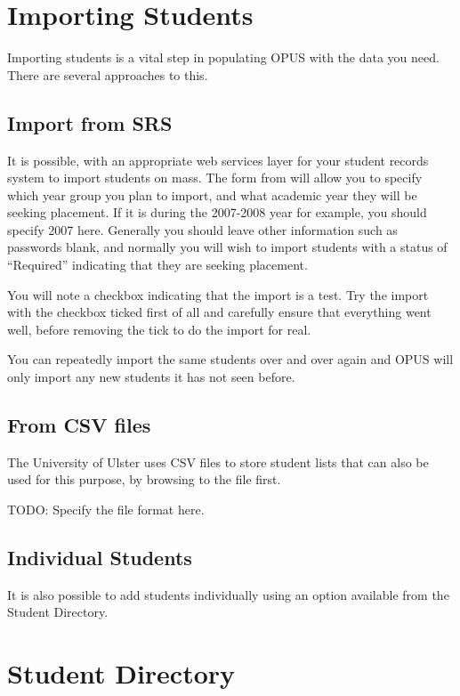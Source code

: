 \documentclass[12 pt]{book}
\begin{document}
\chapter{Importing Students}

Importing students is a vital step in populating OPUS with the data you need. There are several
approaches to this.

\section{Import from SRS}

It is possible, with an appropriate web services layer for your student records system to import
students on mass. The form from  will allow
you to specify which year group you plan to import, and what academic year they will be seeking
placement. If it is during the 2007-2008 year for example, you should specify 2007 here. Generally
you should leave other information such as passwords blank, and normally you will wish to
import students with a status of ``Required'' indicating that they are seeking placement.

You will note a checkbox indicating that the import is a test. Try the import with the checkbox
ticked first of all and carefully ensure that everything went well, before removing the tick
to do the import for real.

You can repeatedly import the same students over and over again and OPUS will only import
any new students it has not seen before.

\section{From CSV files}

The University of Ulster uses CSV files to store student lists that can also be used for this
purpose, by browsing to the file first.

TODO: Specify the file format here.

\section{Individual Students}

It is also possible to add students individually using an option available from the Student
Directory.

\chapter{Student Directory}
\end{document}
